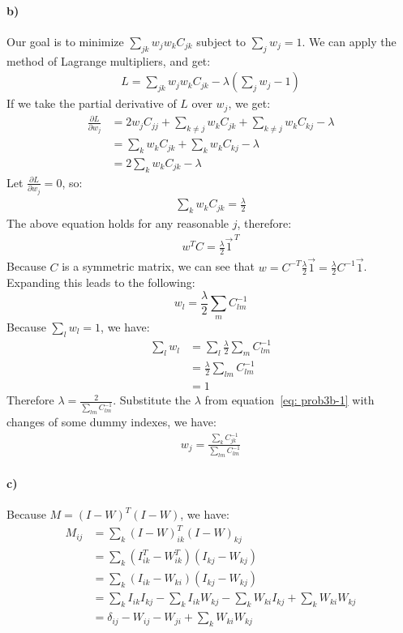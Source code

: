 \documentclass{article}
\begin{document}
\paragraph{b)}
Our goal is to minimize $\sum_{jk} w_j w_k C_{jk}$ subject to $\sum_{j} w_j = 1$. We can apply the method of Lagrange multipliers, and get:
\begin{align*}
L = \sum_{jk} w_j w_k C_{jk} - \lambda (\sum_{j} w_j - 1)
\end{align*}
If we take the partial derivative of $L$ over $w_j$, we get:
\begin{align*}
\frac{\partial L}{\partial w_j} &= 2w_jC_{jj} + \sum_{k \ne j} w_k C_{jk} + \sum_{k \ne j} w_k C_{kj} - \lambda \\
&= \sum_k w_k C_{jk} + \sum_k w_k C_{kj} - \lambda \\
&= 2 \sum_k w_k C_{jk} - \lambda
\end{align*}
Let $\frac{\partial L}{\partial w_j} = 0$, so:
\begin{align*}
\sum_k w_k C_{jk} = \frac{\lambda}{2}
\end{align*}
The above equation holds for any reasonable $j$, therefore:
\begin{align*}
w^T C = \frac{\lambda}{2} \vec{1}^{\,T}
\end{align*}
Because $C$ is a symmetric matrix, we can see that $w = C^{-T} \frac{\lambda}{2} \vec{1} = \frac{\lambda}{2} C^{-1} \vec{1}$. Expanding this leads to the following:
\begin{equation}
\label{eq: prob3b-1}
w_l = \frac{\lambda}{2} \sum_{m} C^{-1}_{lm}
\end{equation}
Because $\sum_{l} w_l = 1$, we have:
\begin{align*}
\sum_{l} w_l &= \sum_l \frac{\lambda}{2} \sum_{m} C^{-1}_{lm} \\
&= \frac{\lambda}{2} \sum_{lm} C^{-1}_{lm} \\
&= 1
\end{align*}
Therefore $\lambda = \frac{2}{\sum_{lm} C^{-1}_{lm}}$. Substitute the $\lambda$ from equation~\ref{eq: prob3b-1} with changes of some dummy indexes, we have:
\begin{align*}
w_j = \frac{\sum_{k} C^{-1}_{jk}}{\sum_{lm} C^{-1}_{lm}} 
\end{align*}

\paragraph{c)} Because $M = (I-W)^T(I-W)$, we have:
\begin{align*}
M_{ij} &= \sum_k (I-W)^T_{ik} (I-W)_{kj} \\
&= \sum_k (I^T_{ik} - W^T_{ik})(I_{kj} - W_{kj}) \\
&= \sum_k (I_{ik} - W_{ki})(I_{kj} - W_{kj}) \\
&= \sum_k I_{ik} I_{kj} - \sum_k I_{ik}W_{kj} - \sum_k W_{ki}I_{kj}  + \sum_k W_{ki} W_{kj} \\
&= \delta_{ij} - W_{ij} - W_{ji}  + \sum_k W_{ki} W_{kj} 
\end{align*}
\end{document}
